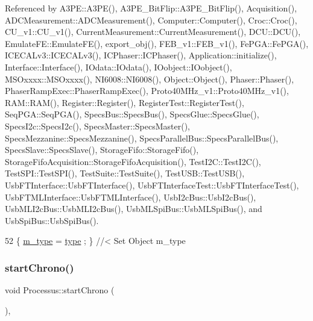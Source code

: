 Referenced by A3\+P\+E\+::\+A3\+P\+E(), A3\+P\+E\+\_\+\+Bit\+Flip\+::\+A3\+P\+E\+\_\+\+Bit\+Flip(), Acquisition(), A\+D\+C\+Measurement\+::\+A\+D\+C\+Measurement(), Computer\+::\+Computer(), Croc\+::\+Croc(), C\+U\+\_\+v1\+::\+C\+U\+\_\+v1(), Current\+Measurement\+::\+Current\+Measurement(), D\+C\+U\+::\+D\+C\+U(), Emulate\+F\+E\+::\+Emulate\+F\+E(), export\+\_\+obj(), F\+E\+B\+\_\+v1\+::\+F\+E\+B\+\_\+v1(), Fe\+P\+G\+A\+::\+Fe\+P\+G\+A(), I\+C\+E\+C\+A\+Lv3\+::\+I\+C\+E\+C\+A\+Lv3(), I\+C\+Phaser\+::\+I\+C\+Phaser(), Application\+::initialize(), Interface\+::\+Interface(), I\+Odata\+::\+I\+Odata(), I\+Oobject\+::\+I\+Oobject(), M\+S\+Oxxxx\+::\+M\+S\+Oxxxx(), N\+I6008\+::\+N\+I6008(), Object\+::\+Object(), Phaser\+::\+Phaser(), Phaser\+Ramp\+Exec\+::\+Phaser\+Ramp\+Exec(), Proto40\+M\+Hz\+\_\+v1\+::\+Proto40\+M\+Hz\+\_\+v1(), R\+A\+M\+::\+R\+A\+M(), Register\+::\+Register(), Register\+Test\+::\+Register\+Test(), Seq\+P\+G\+A\+::\+Seq\+P\+G\+A(), Specs\+Bus\+::\+Specs\+Bus(), Specs\+Glue\+::\+Specs\+Glue(), Specs\+I2c\+::\+Specs\+I2c(), Specs\+Master\+::\+Specs\+Master(), Specs\+Mezzanine\+::\+Specs\+Mezzanine(), Specs\+Parallel\+Bus\+::\+Specs\+Parallel\+Bus(), Specs\+Slave\+::\+Specs\+Slave(), Storage\+Fifo\+::\+Storage\+Fifo(), Storage\+Fifo\+Acquisition\+::\+Storage\+Fifo\+Acquisition(), Test\+I2\+C\+::\+Test\+I2\+C(), Test\+S\+P\+I\+::\+Test\+S\+P\+I(), Test\+Suite\+::\+Test\+Suite(), Test\+U\+S\+B\+::\+Test\+U\+S\+B(), Usb\+F\+T\+Interface\+::\+Usb\+F\+T\+Interface(), Usb\+F\+T\+Interface\+Test\+::\+Usb\+F\+T\+Interface\+Test(), Usb\+F\+T\+M\+L\+Interface\+::\+Usb\+F\+T\+M\+L\+Interface(), Usb\+I2c\+Bus\+::\+Usb\+I2c\+Bus(), Usb\+M\+L\+I2c\+Bus\+::\+Usb\+M\+L\+I2c\+Bus(), Usb\+M\+L\+Spi\+Bus\+::\+Usb\+M\+L\+Spi\+Bus(), and Usb\+Spi\+Bus\+::\+Usb\+Spi\+Bus().


\begin{DoxyCode}
52 \{ \hyperlink{classObject_a457a600fe8c00eb1034374f75110a78c}{m\_type}  = \hyperlink{classObject_a84f99f70f144a83e1582d1d0f84e4e62}{type}  ; \} \textcolor{comment}{//< Set Object m\_type}
\end{DoxyCode}
\mbox{\label{classProcessus_a5e4d34b86241fa0756e07375a14ff4b2}} 
\subsubsection{\texorpdfstring{start\+Chrono()}{startChrono()}}
{\footnotesize\ttfamily void Processus\+::start\+Chrono (\begin{DoxyParamCaption}{ }\end{DoxyParamCaption})\hspace{0.3cm}{\ttfamily [inline]}, {\ttfamily [inherited]}}

